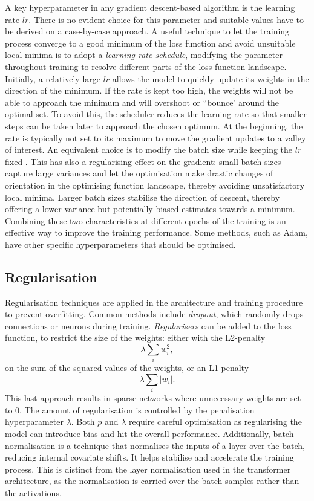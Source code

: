 A key hyperparameter in any gradient descent-based algorithm is the learning rate $lr$. There is no evident choice for this parameter and suitable values have to be derived on a case-by-case approach. A useful technique to let the training process converge to a good minimum of the loss function and avoid unsuitable local minima is to adopt a \textit{learning rate schedule}, modifying the parameter throughout training to resolve different parts of the loss function landscape. Initially, a relatively large $lr$ allows the model to quickly update its weights in the direction of the minimum. If the rate is kept too high, the weights will not be able to approach the minimum and will overshoot or ``bounce' around the optimal set. To avoid this, the scheduler reduces the learning rate so that smaller steps can be taken later to approach the chosen optimum. At the beginning, the rate is typically not set to its maximum to move the gradient updates to a valley of interest. An equivalent choice is to modify the batch size while keeping the $lr$ fixed \cite{smith2017decay}. This has also a regularising effect on the gradient: small batch sizes capture large variances and let the optimisation make drastic changes of orientation in the optimising function landscape, thereby avoiding unsatisfactory local minima. Larger batch sizes stabilise the direction of descent, thereby offering a lower variance but potentially biased estimates towards a minimum. Combining these two characteristics at different epochs of the training is an effective way to improve the training performance. Some methods, such as Adam, have other specific hyperparameters that should be optimised.

\subsection{Regularisation}
Regularisation techniques are applied in the architecture and training procedure to prevent overfitting. Common methods include \textit{dropout}, which randomly drops connections or neurons during training. \textit{Regularisers} can be added to the loss function, to restrict the size of the weights: either with the L2-penalty \[\lambda \sum_i w_i^2,\] on the sum of the squared values of the weights, or an L1-penalty \[\lambda \sum_i |w_i|.\] This last approach results in sparse networks where unnecessary weights are set to 0. The amount of regularisation is controlled by the penalisation hyperparameter $\lambda$. Both $p$ and $\lambda$ require careful optimisation as regularising the model can introduce bias and hit the overall performance. Additionally, batch normalisation is a technique that normalises the inputs of a layer over the batch, reducing internal covariate shifts. It helps stabilise and accelerate the training process. This is distinct from the layer normalisation used in the transformer architecture, as the normalisation is carried over the batch samples rather than the activations. 

